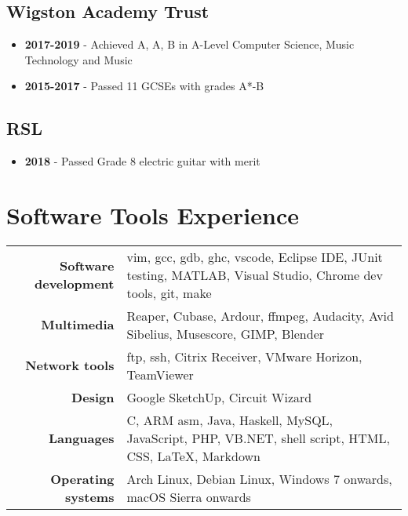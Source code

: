 \documentclass{article}
\begin{document}
\subsection{Wigston Academy Trust}
\begin{itemize}[noitemsep]

\item \textbf{2017-2019} - Achieved A, A, B in A-Level Computer Science, Music Technology and Music
\item \textbf{2015-2017} - Passed 11 GCSEs with grades A*-B

\end{itemize}

\subsection{RSL}
\begin{itemize}[noitemsep]

\item \textbf{2018} - Passed Grade 8 electric guitar with merit

\end{itemize}



\section{Software Tools Experience}

\renewcommand{\arraystretch}{1.4}

\begin{tabular}{ r | p{13cm} }

{\large\bfseries Software development} & {vim, gcc, gdb, ghc, vscode, Eclipse IDE, JUnit testing, MATLAB, Visual Studio, Chrome dev tools, git, make}\\
{\large\bfseries Multimedia} & {Reaper, Cubase, Ardour, ffmpeg, Audacity, Avid Sibelius, Musescore, GIMP, Blender} \\
{\large\bfseries Network tools} & {ftp, ssh, Citrix Receiver, VMware Horizon, TeamViewer} \\
{\large\bfseries Design} & {Google SketchUp, Circuit Wizard} \\
{\large\bfseries Languages} & {C, ARM asm, Java, Haskell, MySQL, JavaScript, PHP, VB.NET, shell script, HTML, CSS, \LaTeX, Markdown}\\
{\large\bfseries Operating systems} & {Arch Linux, Debian Linux, Windows 7 onwards, macOS Sierra onwards}\\
\end{tabular}
\end{document}
